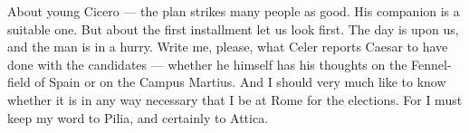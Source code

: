 

 About young Cicero --- the plan strikes many people as good. His companion is a suitable one. But about the first installment let us look first. The day is upon us, and the man is in a hurry. Write me, please, what Celer reports Caesar to have done with the candidates --- whether he himself has his thoughts on the Fennel-field of Spain or on the Campus Martius. And I should very much like to know whether it is in any way necessary that I be at Rome for the elections. For I must keep my word to Pilia, and certainly to Attica.
